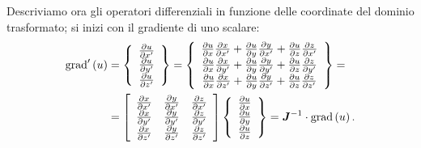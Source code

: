 Descriviamo ora gli operatori differenziali in funzione delle coordinate del dominio trasformato; si inizi con il gradiente di uno scalare:
\begin{align}
\label{eq:4boundarygrad2d_bis}
\text{grad}'\left(u\right) &= \left\{
\begin{array}{c}
\frac{\partial u}{\partial x'}\\
\frac{\partial u}{\partial y'}\\
\frac{\partial u}{\partial z'}
\end{array}
\right\} = \left\{
\begin{array}{c}
\frac{\partial u}{\partial x} \frac{\partial x}{\partial x'}+\frac{\partial u}{\partial y} \frac{\partial y}{\partial x'}+\frac{\partial u}{\partial z} \frac{\partial z}{\partial x'}\\
\frac{\partial u}{\partial x} \frac{\partial x}{\partial y'}+\frac{\partial u}{\partial y} \frac{\partial y}{\partial y'}+\frac{\partial u}{\partial z} \frac{\partial z}{\partial y'}\\
\frac{\partial u}{\partial x} \frac{\partial x}{\partial z'}+\frac{\partial u}{\partial y} \frac{\partial y}{\partial z'}+\frac{\partial u}{\partial z} \frac{\partial z}{\partial z'}
\end{array}\right\} =\nonumber\\
&=  \left[
\begin{array}{ccc}
\frac{\partial x}{\partial x'} & \frac{\partial y}{\partial x'} & \frac{\partial z}{\partial x'}\\
\frac{\partial x}{\partial y'} & \frac{\partial y}{\partial y'} & \frac{\partial z}{\partial y'}\\
\frac{\partial x}{\partial z'} & \frac{\partial y}{\partial z'} & \frac{\partial z}{\partial z'}
\end{array}
\right]
\left\{
\begin{array}{c}
\frac{\partial u}{\partial x}\\
\frac{\partial u}{\partial y}\\
\frac{\partial u}{\partial z}
\end{array}
\right\}= \boldsymbol{J}^{-1} \cdot \text{grad}\left(u\right).
\end{align}

